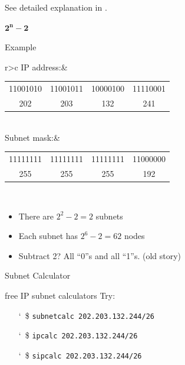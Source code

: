 See detailed explanation in .

\begin{frame}{$\mathbf{2^n-2}$}
  \begin{iblock}{Example}
    \begin{tabular}{r>{\ttfamily}c}\toprule
      IP address:&\begin{tabular}{c@{.}c@{.}c@{.}c}
                    11001010&11001011&10000100&11110001\\
                    202&203&132&241
                  \end{tabular}\\\midrule
      Subnet mask:&\begin{tabular}{c@{.}c@{.}c@{.}c}
                     11111111&11111111&11111111&11000000\\
                     255&255&255&192
                   \end{tabular}\\\bottomrule
    \end{tabular}
  \end{iblock}

  \begin{itemize}
  \item There are $2^2-2 = 2$ subnets
  \item Each subnet has $2^6-2 = 62$ nodes
  \item Subtract 2? All ``0''s and all ``1''s. (old story)
  \end{itemize}
\end{frame}

\begin{frame}{Subnet Calculator}
  \begin{iblock}{free IP subnet calculators}
    Try:
    \begin{itemize}
    \item[\char`~\$]  \texttt{subnetcalc 202.203.132.244/26}
    \item[\char`~\$]  \texttt{ipcalc 202.203.132.244/26}
    \item[\char`~\$]  \texttt{sipcalc 202.203.132.244/26}
    \end{itemize}
  \end{iblock}
\end{frame}

